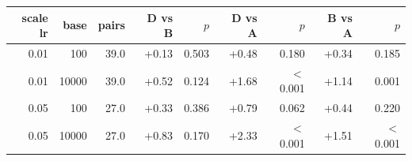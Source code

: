 \begin{tabular}{rrrrrrrrr}
\toprule
scale lr & base & pairs & D vs B & $p$ & D vs A & $p$ & B vs A & $p$ \\
\midrule
0.01 & 100 & 39.0 & +0.13 & 0.503 & +0.48 & 0.180 & +0.34 & 0.185 \\
0.01 & 10000 & 39.0 & +0.52 & 0.124 & +1.68 & $<$0.001 & +1.14 & 0.001 \\
0.05 & 100 & 27.0 & +0.33 & 0.386 & +0.79 & 0.062 & +0.44 & 0.220 \\
0.05 & 10000 & 27.0 & +0.83 & 0.170 & +2.33 & $<$0.001 & +1.51 & $<$0.001 \\
\bottomrule
\end{tabular}
